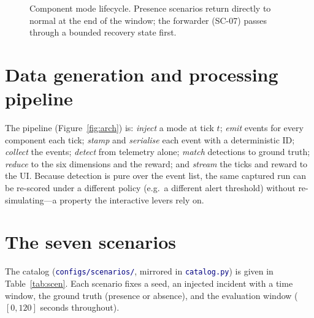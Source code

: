 \documentclass[11pt]{article}
\newcommand{\file}[1]{\textcolor{navy}{\texttt{\small #1}}}
\begin{document}
\begin{figure}[h]
\centering
{}
\caption{Component mode lifecycle. Presence scenarios return directly to normal at
the end of the window; the forwarder (SC-07) passes through a bounded recovery
state first.}
\label{fig:lifecycle}
\end{figure}

\section{Data generation and processing pipeline}
The pipeline (Figure~\ref{fig:arch}) is: \emph{inject} a mode at tick $t$;
\emph{emit} events for every component each tick; \emph{stamp} and
\emph{serialise} each event with a deterministic ID; \emph{collect} the events;
\emph{detect} from telemetry alone; \emph{match} detections to ground truth;
\emph{reduce} to the six dimensions and the reward; and \emph{stream} the ticks
and reward to the UI. Because detection is pure over the event list, the same
captured run can be re-scored under a different policy (e.g.\ a different alert
threshold) without re-simulating---a property the interactive levers rely on.

\section{The seven scenarios}
The catalog (\file{configs/scenarios/}, mirrored in \file{catalog.py}) is given in
Table~\ref{tab:scen}. Each scenario fixes a seed, an injected incident with a time
window, the ground truth (presence or absence), and the evaluation window
($[0,120]$ seconds throughout).
\end{document}
